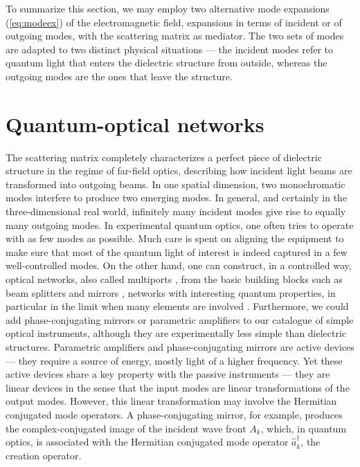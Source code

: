 \documentclass[12pt,amsmath,amssymb]{article}
\numberwithin{equation}{section}
\begin{document}
To summarize this section,
we may employ two alternative mode expansions (\ref{eq:modeex})
of the electromagnetic field, expansions in terms of incident
or of outgoing modes, with the scattering matrix as mediator.
The two sets of modes are adapted to two distinct physical situations
--- the incident modes refer to quantum light that enters the dielectric
structure from outside, whereas the outgoing modes are the ones
that leave the structure.

\section{Quantum-optical networks}

The scattering matrix completely characterizes a perfect piece of
dielectric structure in the regime of far-field optics,
describing how incident light beams are transformed into outgoing
beams. In one spatial dimension, two monochromatic modes
interfere to produce two emerging modes. In general, and
certainly in the three-dimensional real world, infinitely many
incident modes give rise to equally many outgoing modes. In
experimental quantum optics, one often tries to operate with as
few modes as possible. Much care is spent on aligning the
equipment to make sure that most of the quantum light of interest
is indeed captured in a few well-controlled modes. On the other
hand, one can construct, in a controlled way, optical networks,
also called multiports \cite{Walker},
from the basic building blocks such as
beam splitters and mirrors \cite{Mattle,Reck,Torma1,Torma3,Welsch},
networks with interesting quantum properties, in particular
in the limit when many elements are involved
\cite{Torma2,Torma4}.
Furthermore, we could add
phase-conjugating mirrors \cite{Shen} or parametric amplifiers
\cite{Shen} to our catalogue of simple optical instruments,
although they are experimentally less simple than dielectric
structures. Parametric amplifiers \cite{Shen} and
phase-conjugating mirrors \cite{Shen} are active devices --- they
require a source of energy, mostly light of a higher frequency.
Yet these active devices share a key property with the passive
instruments --- they are linear devices in the sense that the
input modes are linear transformations of the output modes.
However, this linear transformation may involve the Hermitian
conjugated mode operators. A phase-conjugating mirror, for
example, produces the complex-conjugated image of the incident
wave front $A_k$, which, in quantum optics, is associated with
the Hermitian conjugated mode operator $\hat{a}_k^\dagger$, the
creation operator.
\end{document}
